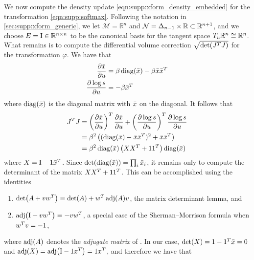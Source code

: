 We now compute the density update \eqref{eqn:supp:xform_density_embedded} for the transformation \eqref{eqn:supp:softmax}.
Following the notation in \cref{sec:supp:xform_generic}, we let $\mathcal{M} = \mathbb{R}^{n}$ and $\mathcal{N} = \Delta_{n-1} \times \mathbb{R} \subset \mathbb{R}^{n+1}$, and we choose $E = \mathrm{I} \in \mathbb{R}^{n \times n}$ to be the canonical basis for the tangent space $T_{u} \mathbb{R}^{n} \cong \mathbb{R}^{n}$.
What remains is to compute the differential volume correction $\sqrt{\Det{ \vv{J}^T \vv{J} }}$ for the transformation $\varphi$.
We have that
\begin{align}
    \frac{\partial \vv{\bar{x}}}{\partial \vv{u}} & = \beta \Diag{\vv{\bar{x}}} - \beta \vv{\bar{x}} \vv{\bar{x}}^T \\
    \frac{\partial \log s}{\partial \vv{u}}       & = -\beta \vv{\bar{x}}^T
\end{align}
where $\Diag{\vv{\bar{x}}}$ is the diagonal matrix with $\bar{x}$ on the diagonal.
It follows that
\begin{align*}
    \vv{J}^T \vv{J} & =
    \left( \frac{\partial \vv{\bar{x}}}{\partial \vv{u}} \right)^T \frac{\partial \vv{\bar{x}}}{\partial \vv{u}} +
    \left( \frac{\partial \log s}{\partial \vv{u}} \right)^T \frac{\partial \log s}{\partial \vv{u}}                               \\
                    & = \beta^2 \left( (\Diag{\vv{\bar{x}}} - \vv{\bar{x}} \vv{\bar{x}}^T)^2 + \vv{\bar{x}} \vv{\bar{x}}^T \right) \\
                    & = \beta^2 \Diag{\vv{\bar{x}}} \left( \vv{X} \vv{X}^T + \One \One^T \right) \Diag{\vv{\bar{x}}}
\end{align*}
where $X = \mathrm{I} - \mathrm{1} \bar{x}^T$.
Since $\Det{ \Diag{\vv{\bar{x}}} } = \prod_i \vv{\bar{x}}_i$, it remains only to compute the determinant of the matrix $X X^T + \mathrm{1} \mathrm{1}^T$.
This can be accomplished using the identities
\begin{enumerate}
    \item $\Det{ \vv{A} + \vv{v} \vv{w}^T } = \Det{ \vv{A} } + \vv{w}^T \Adj{\vv{A}} \vv{v}$, the matrix determinant lemma, and
    \item $\Adj{ \Id + \vv{v} \vv{w}^T } = -\vv{v} \vv{w}^T$, a special case of the Sherman--Morrison formula when $w^T v = -1$,
\end{enumerate}
where $\Adj{\vv{A}}$ denotes the \textit{adjugate matrix} of .
In our case, $\Det{ \vv{X} } = 1 - \One^T \vv{\bar{x}} = 0$ and $\Adj{\vv{X}} = \Adj{\Id - \One \vv{\bar{x}}^T} = \One \vv{\bar{x}}^T$, and therefore we have that

